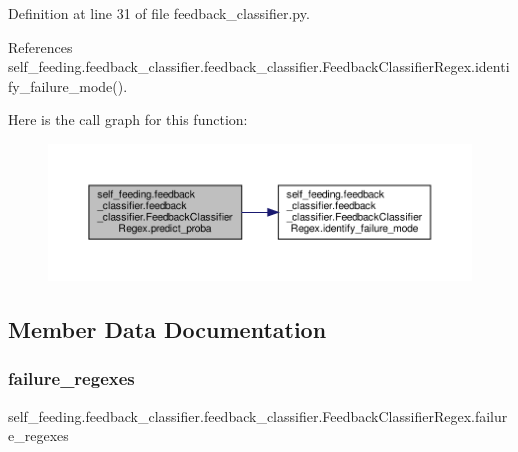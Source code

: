 Definition at line 31 of file feedback\+\_\+classifier.\+py.



References self\+\_\+feeding.\+feedback\+\_\+classifier.\+feedback\+\_\+classifier.\+Feedback\+Classifier\+Regex.\+identify\+\_\+failure\+\_\+mode().

Here is the call graph for this function\+:
\nopagebreak
\begin{figure}[H]
\begin{center}
\leavevmode
\includegraphics[width=350pt]{classself__feeding_1_1feedback__classifier_1_1feedback__classifier_1_1FeedbackClassifierRegex_a556ca2e477a4c21107241fbde7f2f8ab_cgraph}
\end{center}
\end{figure}


\subsection{Member Data Documentation}
\mbox{\label{classself__feeding_1_1feedback__classifier_1_1feedback__classifier_1_1FeedbackClassifierRegex_ac94df17ef727444efbe54c47c455de9c}} 
\subsubsection{\texorpdfstring{failure\+\_\+regexes}{failure\_regexes}}
{\footnotesize\ttfamily self\+\_\+feeding.\+feedback\+\_\+classifier.\+feedback\+\_\+classifier.\+Feedback\+Classifier\+Regex.\+failure\+\_\+regexes}



